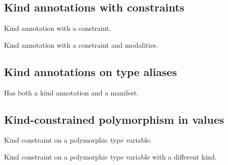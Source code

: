 \subsection{Kind annotations with  constraints\label{Oxcaml--kind-annotations-with-with-constraints}}%
\label{Oxcaml--type-t_with}\begin{ocamlindent}Kind annotation with a  constraint.\end{ocamlindent}%
\medbreak
\label{Oxcaml--type-t_with_modalities}\begin{ocamlindent}Kind annotation with a  constraint and modalities.\end{ocamlindent}%
\medbreak
\subsection{Kind annotations on type aliases\label{Oxcaml--kind-annotations-on-type-aliases}}%
\label{Oxcaml--type-t_alias}\begin{ocamlindent}Has both a kind annotation and a manifest.\end{ocamlindent}%
\medbreak
\subsection{Kind-constrained polymorphism in values\label{Oxcaml--kind-constrained-polymorphism-in-values}}%
\label{Oxcaml--val-poly_immediate}\begin{ocamlindent}Kind constraint on a polymorphic type variable.\end{ocamlindent}%
\medbreak
\label{Oxcaml--val-poly_float64}\begin{ocamlindent}Kind constraint on a polymorphic type variable with a different kind.\end{ocamlindent}%
\medbreak
